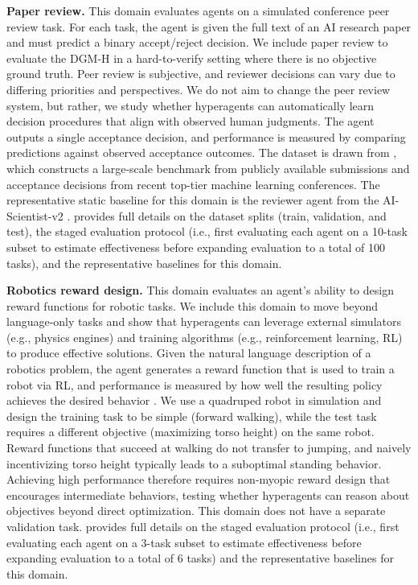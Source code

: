 \documentclass[]{fairmeta}
\begin{document}
\textbf{Paper review.}
This domain evaluates agents on a simulated conference peer review task. For each task, the agent is given the full text of an AI research paper and must predict a binary accept/reject decision. We include paper review to evaluate the DGM-H in a hard-to-verify setting where there is no objective ground truth. Peer review is subjective, and reviewer decisions can vary due to differing priorities and perspectives. We do not aim to change the peer review system, but rather, we study whether hyperagents can automatically learn decision procedures that align with observed human judgments. The agent outputs a single acceptance decision, and performance is measured by comparing predictions against observed acceptance outcomes. The dataset is drawn from \citet{zhao2026apres}, which constructs a large-scale benchmark from publicly available submissions and acceptance decisions from recent top-tier machine learning conferences. The representative static baseline for this domain is the reviewer agent from the AI-Scientist-v2 \citep{yamada2025ai}.  provides full details on the dataset splits (train, validation, and test), the staged evaluation protocol (i.e., first evaluating each agent on a 10-task subset to estimate effectiveness before expanding evaluation to a total of 100 tasks), and the representative baselines for this domain.

\textbf{Robotics reward design.}
This domain evaluates an agent's ability to design reward functions for robotic tasks. We include this domain to move beyond language-only tasks and show that hyperagents can leverage external simulators (e.g., physics engines) and training algorithms (e.g., reinforcement learning, RL) to produce effective solutions. Given the natural language description of a robotics problem, the agent generates a reward function that is used to train a robot via RL, and performance is measured by how well the resulting policy achieves the desired behavior \citep{maeureka}. We use a quadruped robot in simulation \citep{genesis2024} and design the training task to be simple (forward walking), while the test task requires a different objective (maximizing torso height) on the same robot. Reward functions that succeed at walking do not transfer to jumping, and naively incentivizing torso height typically leads to a suboptimal standing behavior. Achieving high performance therefore requires non-myopic reward design that encourages intermediate behaviors, testing whether hyperagents can reason about objectives beyond direct optimization. This domain does not have a separate validation task.  provides full details on the staged evaluation protocol (i.e., first evaluating each agent on a 3-task subset to estimate effectiveness before expanding evaluation to a total of 6 tasks) and the representative baselines for this domain.
\end{document}
